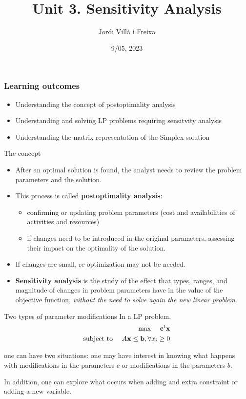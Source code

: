 \documentclass[c]{beamer}
\title[Introduction]{Unit 3. Sensitivity Analysis}
\author{Jordi Villà i Freixa}
\institute[FCTE]{
Universitat de Vic - Universitat Central de Catalunya \\
Study Abroad. Operations Research\\
\medskip
\textit{jordi.villa@uvic.cat}
}
\date{9/05, 2023}
\begin{document}
\begin{frame}
\titlepage
\end{frame}




\begin{frame}
\frametitle{Learning outcomes}
\begin{itemize}
  \item Understanding the concept of postoptimality analysis
  \item Understanding and solving LP problems requiring sensitvity analysis
  \item Understanding the matrix representation of the Simplex solution
\end{itemize}
\end{frame}

\begin{frame}{The concept}
\begin{itemize}
  \item After an optimal solution is found, the analyst needs to review the problem parameters and the solution.
  \item This process is called {\bf postoptimality analysis}:
  \begin{itemize}
    \item confirming or updating problem parameters (cost and availabilities of activities and resources)
    \item if changes need to be introduced in the original parameters, assessing their impact on the optimality of the solution.
  \end{itemize}
  \item If changes are small, re-optimization may not be needed.
  \item {\bf Sensitivity analysis} is the study of the effect that types, ranges, and magnitude of changes in problem parameters have in the value of the objective function, {\em without the need to solve again the new linear problem}.
\end{itemize}
\end{frame}

\begin{frame}{Two types of parameter modifications}
  In a LP problem, 
\begin{eqnarray*}
 \text{max }\quad\textbf{c}^t \textbf{x}\\
 \text{subject to }\quad A\textbf{x}\leq \textbf{b}, \forall x_i\geq0
\end{eqnarray*}

one can have two situations: one may have interest in knowing what happens with modifications in the parameters $c$ or modifications in the parameters $b$.

In addition, one can explore what occurs when adding and extra constraint or adding a new variable.

\end{frame}
\end{document}
